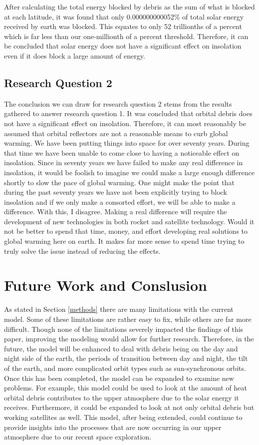 \documentclass[11pt]{article}
\begin{document}
\begin{multicols*}{2}
After calculating the total energy blocked by debris as the sum of what is blocked at each latitude, it was found that only 0.000000000052\% of total solar energy received by earth was blocked. This equates to only 52 trillionths of a percent which is far less than our one-millionth of a percent threshold. Therefore, it can be concluded that solar energy does not have a significant effect on insolation even if it does block a large amount of energy.

\subsection{Research Question 2}
The conclusion we can draw for research question 2 stems from the results gathered to answer research question 1. It was concluded that orbital debris does not have a significant effect on insolation. Therefore, it can most reasonably be assumed that orbital reflectors are not a reasonable means to curb global warming. We have been putting things into space for over seventy years. During that time we have been unable to come close to having a noticeable effect on insolation. Since in seventy years we have failed to make any real difference in insolation, it would be foolish to imagine we could make a large enough difference shortly to slow the pace of global warming. One might make the point that during the past seventy years we have not been explicitly trying to block insolation and if we only make a consorted effort, we will be able to make a difference. With this, I disagree. Making a real difference will require the development of new technologies in both rocket and satellite technology. Would it not be better to spend that time, money, and effort developing real solutions to global warming here on earth. It makes far more sense to spend time trying to truly solve the issue instead of reducing the effects. 

\section{Future Work and Conslusion} \label{conclusion}
As stated in Section \ref{methods} there are many limitations with the current model. Some of these limitations are rather easy to fix, while others are far more difficult. Though none of the limitations severely impacted the findings of this paper, improving the modeling would allow for further research. Therefore, in the future, the model will be enhanced to deal with debris being on the day and night side of the earth, the periods of transition between day and night, the tilt of the earth, and more complicated orbit types such as sun-synchronous orbits. Once this has been completed, the model can be expanded to examine new problems. For example, this model could be used to look at the amount of heat orbital debris contributes to the upper atmosphere due to the solar energy it receives. Furthermore, it could be expanded to look at not only orbital debris but working satellites as well. This model, after being extended, could continue to provide insights into the processes that are now occurring in our upper atmosphere due to our recent space exploration.


\end{multicols*}
\end{document}
